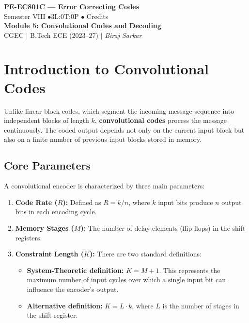 \documentclass[12pt,a4paper]{article}
\begin{document}

\begin{center}
  {\LARGE\bfseries\color{myred} PE-EC801C --- Error Correcting Codes}\\[5pt]
  {\normalsize\color{mydark} Semester VIII \quad$\bullet$\quad 3L:0T:0P \quad$\bullet$ Credits}\\[3pt]
  {\normalsize\color{myteal}\textbf{Module 5: Convolutional Codes and Decoding}}\\[3pt]
  {\small\color{mydark} CGEC \;$|$\; B.Tech ECE (2023--27) \;$|$\; \textit{Biraj Sarkar}}
\end{center}
\vspace{2pt}
\noindent{\color{myred}\rule{\linewidth}{1.5pt}}
\vspace{2pt}

\hypersetup{linkcolor=mydark}
\tableofcontents
\hypersetup{linkcolor=myteal}
\newpage

\section{Introduction to Convolutional Codes}

Unlike linear block codes, which segment the incoming message sequence into independent blocks of length $k$, \textbf{convolutional codes} process the message continuously. The coded output depends not only on the current input block but also on a finite number of previous input blocks stored in memory.

\subsection{Core Parameters}
A convolutional encoder is characterized by three main parameters:
\begin{enumerate}[leftmargin=*, itemsep=3pt]
  \item \textbf{Code Rate (\texorpdfstring{$R$}{R}):} Defined as $R = k/n$, where $k$ input bits produce $n$ output bits in each encoding cycle.
  \item \textbf{Memory Stages (\texorpdfstring{$M$}{M}):} The number of delay elements (flip-flops) in the shift registers.
  \item \textbf{Constraint Length (\texorpdfstring{$K$}{K}):} There are two standard definitions:
    \begin{itemize}[leftmargin=*, itemsep=2pt]
      \item \textbf{System-Theoretic definition:} $K = M + 1$. This represents the maximum number of input cycles over which a single input bit can influence the encoder's output.
      \item \textbf{Alternative definition:} $K = L \cdot k$, where $L$ is the number of stages in the shift register.
    \end{itemize}
\end{enumerate}
\end{document}
